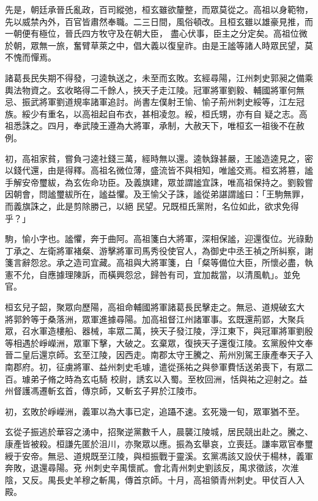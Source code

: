 \begin{pinyinscope}
 先是，朝廷承晉氏亂政，百司縱弛，桓玄雖欲釐整，而眾莫從之。高祖以身範物，先以威禁內外，百官皆肅然奉職。二三日間，風俗頓改。且桓玄雖以雄豪見推，而一朝便有極位，晉氏四方牧守及在朝大臣，
 盡心伏事，臣主之分定矣。高祖位微於朝，眾無一旅，奮臂草萊之中，倡大義以復皇祚。由是王謐等諸人時眾民望，莫不愧而憚焉。



 諸葛長民失期不得發，刁逵執送之，未至而玄敗。玄經尋陽，江州刺史郭昶之備乘輿法物資之。玄收略得二千餘人，挾天子走江陵。冠軍將軍劉毅、輔國將軍何無忌、振武將軍劉道規率諸軍追討。尚書左僕射王愉、愉子荊州刺史綏等，江左冠族。綏少有重名，以高祖起自布衣，甚相凌忽。綏，桓氏甥，亦有自
 疑之志。高祖悉誅之。四月，奉武陵王遵為大將軍，承制，大赦天下，唯桓玄一祖後不在赦例。



 初，高祖家貧，嘗負刁逵社錢三萬，經時無以還。逵執錄甚嚴，王謐造逵見之，密以錢代還，由是得釋。高祖名微位薄，盛流皆不與相知，唯謐交焉。桓玄將篡，謐手解安帝璽紱，為玄佐命功臣。及義旗建，眾並謂謐宜誅，唯高祖保持之。劉毅嘗因朝會，問謐璽紱所在，謐益懼。及王愉父子誅，謐從弟諶謂謐曰：「王駒無罪，而義旗誅之，此是剪除勝己，以絕
 民望。兄既桓氏黨附，名位如此，欲求免得乎？」



 駒，愉小字也。謐懼，奔于曲阿。高祖箋白大將軍，深相保謐，迎還復位。光祿勳丁承之、左衛將軍褚粲、游擊將軍司馬秀役使官人，為御史中丞王禎之所糾察，謝箋言辭怨忿。承之造司宜藏。高祖與大將軍箋，白「粲等備位大臣，所懷必盡，執憲不允，自應據理陳訴，而橫興怨忿，歸咎有司，宜加裁當，以清風軌」。並免官。



 桓玄兒子韶，聚眾向歷陽，高祖命輔國將軍諸葛長民擊走之。無忌、道規破玄大
 將郭鈐等于桑落洲，眾軍進據尋陽。加高祖督江州諸軍事。玄既還荊郢，大聚兵眾，召水軍造樓船、器械，率眾二萬，挾天子發江陵，浮江東下，與冠軍將軍劉殷等相遇於崢嶸洲，眾軍下擊，大破之。玄棄眾，復挾天子還復江陵。玄黨殷仲文奉晉二皇后還京師。玄至江陵，因西走。南郡太守王騰之、荊州別駕王康產奉天子入南郡府。初，征虜將軍、益州刺史毛璩，遣從孫祐之與參軍費恬送弟喪下，有眾二百。璩弟子脩之時為玄屯騎
 校尉，誘玄以入蜀。至枚回洲，恬與祐之迎射之。益州督護馮遷斬玄首，傳京師，又斬玄子昇於江陵市。



 初，玄敗於崢嶸洲，義軍以為大事已定，追躡不速。玄死幾一旬，眾軍猶不至。



 玄從子振逃於華容之湧中，招聚逆黨數千人，晨襲江陵城，居民競出赴之。騰之、康產皆被殺。桓謙先匿於沮川，亦聚眾以應。振為玄舉哀，立喪廷。謙率眾官奉璽綬于安帝。無忌、道規既至江陵，與桓振戰于靈溪。玄黨馮該又設伏于楊林，義軍奔敗，退還尋陽。兗
 州刺史辛禺懷貳。會北青州刺史劉該反，禺求徵該，次淮陰，又反。禺長史羊穆之斬禺，傳首京師。十月，高祖領青州刺史。甲仗百人入殿。




\end{pinyinscope}
